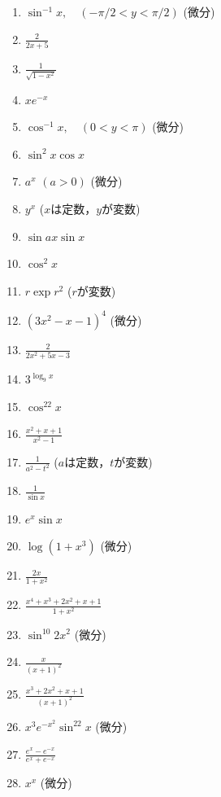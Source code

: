 \documentclass[twocolumn,11pt]{jarticle}
\begin{document}
{\begin{enumerate}
\item \label{ditemapp:sin-1x}$\displaystyle \sin^{-1}x,\quad(-\pi/2<y<\pi/2)$ (微分)
\item \label{ditemapp:1/x}$\displaystyle\frac{2}{2x+5}$
\item \label{itemapp:1/sqrt(1-x2)}$\displaystyle \frac{1}{\sqrt{1-x^2}}$
\item \label{itemapp:xe-x}$\displaystyle xe^{-x} $
\item \label{ditemapp:cos-1x}$\displaystyle \cos^{-1}x,\quad(0<y<\pi)$ (微分)
\item \label{itemapp:sin2xcosx}$\displaystyle\sin^2x\cos x$
\item \label{ditemapp:ax}$a^x$ $(a>0)$ (微分)
\item $y^x$ ($x$は定数，$y$が変数)
\item \label{itemapp:sinaxsinx}$\displaystyle\sin ax\sin x$
\item $\cos^2 x$
\item $r\exp r^2$ ($r$が変数)
\item \label{ditemapp:3x2-x-1}$(3x^2-x-1)^4$ (微分)
\item $\displaystyle\frac{2}{2x^2+5x-3}$
\item $3^{\log_9x}$
\item \label{itemapp:cos22x}$\displaystyle \cos^22x$
\item $\displaystyle\frac{x^2+x+1}{x^2-1}$
\item \label{itemapp:1/(a2-t2)}$\displaystyle \frac{1}{a^2-t^2}$
  ($a$は定数，$t$が変数)
\item \label{itemapp:1/sinx}$\displaystyle \frac{1}{\sin x}$
\item \label{itemapp:e2sinx}$\displaystyle e^x\sin x $
\item \label{itemapp:log(1+x3)}$\displaystyle \log(1+x^3)$ (微分)
\item \label{itemapp:x/1+x2}$\displaystyle \frac{2x}{1+x^2}$
\item \label{itemapp:f(x)/1+x2}$\displaystyle \frac{x^4+x^3+2x^2+x+1}{1+x^2}$
\item \label{ditemapp:sin102x2}$\sin^{10}2x^2$ (微分)
\item \label{itemapp:x/(x+1)^2}$\displaystyle\frac{x}{(x+1)^2}$
\item \label{itemapp:x3+2x2+x+1/(x+1)^2}
  $\displaystyle\frac{x^3+2x^2+x+1}{(x+1)^2}$
\item \label{itemapp:x3e-x2sin22x}$\displaystyle x^3e^{-x^2}\sin^22x$ (微分)
\item \label{itemapp:tanhx}$\displaystyle \frac{e^x-e^{-x}}{e^x+e^{-x}}$
\item \label{itemapp:x^x}$x^x$ (微分)
\end{enumerate}
}
\end{document}
